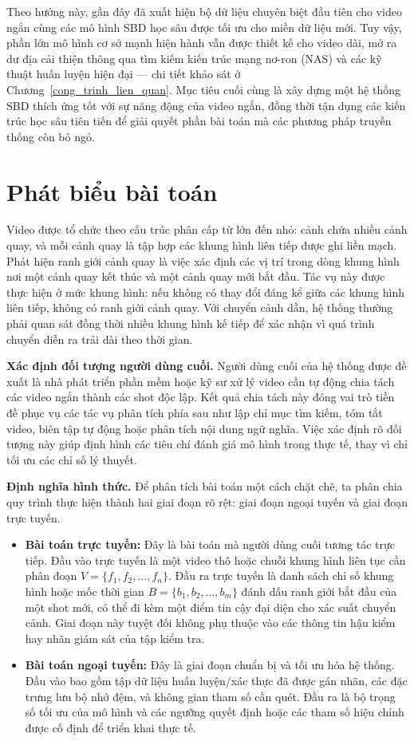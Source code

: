 Theo hướng này, gần đây đã xuất hiện bộ dữ liệu chuyên biệt đầu tiên cho video ngắn \cite{zhu2023autoshot} cùng các mô hình SBD học sâu được tối ưu cho miền dữ liệu mới. Tuy vậy, phần lớn mô hình cơ sở mạnh hiện hành vẫn được thiết kế cho video dài, mở ra dư địa cải thiện thông qua tìm kiếm kiến trúc mạng nơ-ron (NAS) và các kỹ thuật huấn luyện hiện đại --- chi tiết khảo sát ở Chương~\ref{cong_trinh_lien_quan}. Mục tiêu cuối cùng là xây dựng một hệ thống SBD thích ứng tốt với sự năng động của video ngắn, đồng thời tận dụng các kiến trúc học sâu tiên tiến để giải quyết phần bài toán mà các phương pháp truyền thống còn bỏ ngỏ.

\section{Phát biểu bài toán}
Video được tổ chức theo cấu trúc phân cấp từ lớn đến nhỏ: cảnh chứa nhiều cảnh quay, và mỗi cảnh quay là tập hợp các khung hình liên tiếp được ghi liền mạch. Phát hiện ranh giới cảnh quay là việc xác định các vị trí trong dòng khung hình nơi một cảnh quay kết thúc và một cảnh quay mới bắt đầu. Tác vụ này được thực hiện ở mức khung hình: nếu không có thay đổi đáng kể giữa các khung hình liên tiếp, không có ranh giới cảnh quay. Với chuyển cảnh dần, hệ thống thường phải quan sát đồng thời nhiều khung hình kế tiếp để xác nhận vì quá trình chuyển diễn ra trải dài theo thời gian.

\textbf{Xác định đối tượng người dùng cuối.} Người dùng cuối của hệ thống được đề xuất là nhà phát triển phần mềm hoặc kỹ sư xử lý video cần tự động chia tách các video ngắn thành các shot độc lập. Kết quả chia tách này đóng vai trò tiền đề phục vụ các tác vụ phân tích phía sau như lập chỉ mục tìm kiếm, tóm tắt video, biên tập tự động hoặc phân tích nội dung ngữ nghĩa. Việc xác định rõ đối tượng này giúp định hình các tiêu chí đánh giá mô hình trong thực tế, thay vì chỉ tối ưu các chỉ số lý thuyết.

\textbf{Định nghĩa hình thức.} Để phân tích bài toán một cách chặt chẽ, ta phân chia quy trình thực hiện thành hai giai đoạn rõ rệt: giai đoạn ngoại tuyến và giai đoạn trực tuyến.
\begin{itemize}
    \item \textbf{Bài toán trực tuyến:} Đây là bài toán mà người dùng cuối tương tác trực tiếp. Đầu vào trực tuyến là một video thô hoặc chuỗi khung hình liên tục cần phân đoạn $V = \{f_1, f_2, \dots, f_n\}$. Đầu ra trực tuyến là danh sách chỉ số khung hình hoặc mốc thời gian $B = \{b_1, b_2, \dots, b_m\}$ đánh dấu ranh giới bắt đầu của một shot mới, có thể đi kèm một điểm tin cậy đại diện cho xác suất chuyển cảnh. Giai đoạn này tuyệt đối không phụ thuộc vào các thông tin hậu kiểm hay nhãn giám sát của tập kiểm tra.
    
    \item \textbf{Bài toán ngoại tuyến:} Đây là giai đoạn chuẩn bị và tối ưu hóa hệ thống. Đầu vào bao gồm tập dữ liệu huấn luyện/xác thực đã được gán nhãn, các đặc trưng lưu bộ nhớ đệm, và không gian tham số cần quét. Đầu ra là bộ trọng số tối ưu của mô hình và các ngưỡng quyết định hoặc các tham số hiệu chỉnh được cố định để triển khai thực tế.
\end{itemize}

